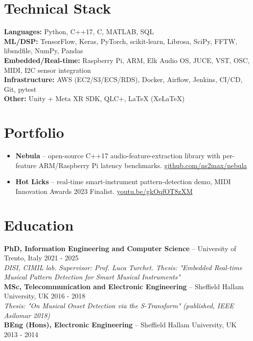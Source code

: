 \documentclass[11pt]{article}
\begin{document}
\section*{Technical Stack}
\textbf{Languages:} Python, C++17, C, MATLAB, SQL \\
\textbf{ML/DSP:} TensorFlow, Keras, PyTorch, scikit-learn, Librosa, SciPy, FFTW, libsndfile, NumPy, Pandas \\
\textbf{Embedded/Real-time:} Raspberry Pi, ARM, Elk Audio OS, JUCE, VST, OSC, MIDI, I2C sensor integration \\
\textbf{Infrastructure:} AWS (EC2/S3/ECS/RDS), Docker, Airflow, Jenkins, CI/CD, Git, pytest \\
\textbf{Other:} Unity + Meta XR SDK, QLC+, LaTeX (XeLaTeX)

\section*{Portfolio}
\begin{itemize}[leftmargin=1.4em, itemsep=-0.2em, topsep=0.1em]
  \item \textbf{Nebula} -- open-source C++17 audio-feature-extraction library with per-feature ARM/Raspberry Pi latency benchmarks. \href{https://github.com/ns2max/nebula}{github.com/ns2max/nebula}
  \item \textbf{Hot Licks} -- real-time smart-instrument pattern-detection demo, MIDI Innovation Awards 2023 Finalist. \href{https://youtu.be/gkOqfOT8zXM}{youtu.be/gkOqfOT8zXM}
\end{itemize}

\section*{Education}
\textbf{PhD, Information Engineering and Computer Science} -- University of Trento, Italy \hfill 2021 - 2025 \\
\textit{\small DISI, CIMIL lab. Supervisor: Prof. Luca Turchet. Thesis: "Embedded Real-time Musical Pattern Detection for Smart Musical Instruments"} \\[2pt]
\textbf{MSc, Telecommunication and Electronic Engineering} -- Sheffield Hallam University, UK \hfill 2016 - 2018 \\
\textit{\small Thesis: "On Musical Onset Detection via the S-Transform" (published, IEEE Asilomar 2018)} \\[2pt]
\textbf{BEng (Hons), Electronic Engineering} -- Sheffield Hallam University, UK \hfill 2013 - 2014
\end{document}
